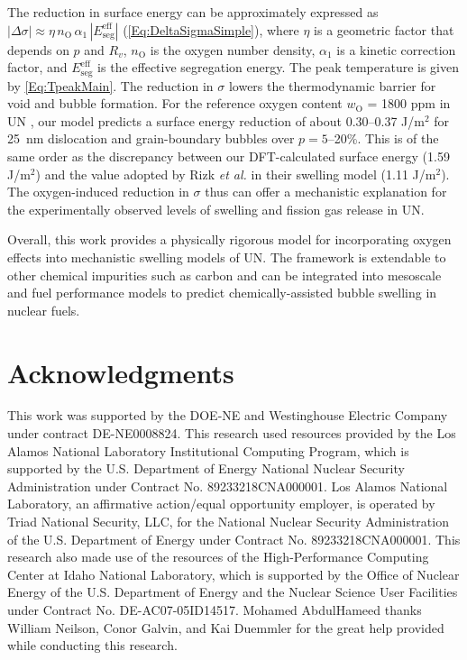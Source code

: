 \documentclass[preprint,12pt,sort&compress]{elsarticle}
\newcommand{\?}{\stackrel{?}{=}}
\begin{document}
The reduction in surface energy can be approximately expressed as $|\Delta \sigma| \approx \eta \, n_\text{O} \, \alpha_1 \, |E_\text{seg}^\text{eff}|$ (\cref{Eq:DeltaSigmaSimple}), where $\eta$ is a geometric factor that depends on $p$ and $R_v$, $n_\text{O}$ is the oxygen number density, $\alpha_1$ is a kinetic correction factor, and $E_\text{seg}^\text{eff}$ is the effective segregation energy. The peak temperature is given by \cref{Eq:TpeakMain}. The reduction in $\sigma$ lowers the thermodynamic barrier for void and bubble formation. For the reference oxygen content $w_\text{O}$ = 1800 ppm in UN \cite{Ronchi1975}, our model predicts a surface energy reduction of about 0.30--0.37 J/m$^2$ for 25~nm dislocation and grain-boundary bubbles over $p=5$--20\%. This is of the same order as the discrepancy between our DFT-calculated surface energy (1.59 J/m$^2$) and the value adopted by Rizk \textit{et al.} \cite{Rizk2025} in their swelling model (1.11 J/m$^2$). The oxygen-induced reduction in $\sigma$ thus can offer a mechanistic explanation for the experimentally observed levels of swelling and fission gas release in UN. %

Overall, this work provides a physically rigorous model for incorporating oxygen effects into mechanistic swelling models of UN. The framework is extendable to other chemical impurities such as carbon and can be integrated into mesoscale and fuel performance models to predict chemically-assisted bubble swelling in nuclear fuels.

\section{Acknowledgments}

This work was supported by the DOE-NE and Westinghouse Electric Company under contract DE-NE0008824. This research used resources provided by the Los Alamos National Laboratory Institutional Computing Program, which is supported by the U.S. Department of Energy National Nuclear Security Administration under Contract No. 89233218CNA000001. Los Alamos National Laboratory, an affirmative action/equal opportunity employer, is operated by Triad National Security, LLC, for the National Nuclear Security Administration of the U.S. Department of Energy under Contract No. 89233218CNA000001. This research also made use of the resources of the High-Performance Computing Center at Idaho National Laboratory, which is supported by the Office of Nuclear Energy of the U.S. Department of Energy and the Nuclear Science User Facilities under Contract No. DE-AC07-05ID14517. Mohamed AbdulHameed thanks William Neilson, Conor Galvin, and Kai Duemmler for the great help provided while conducting this research.
\end{document}
